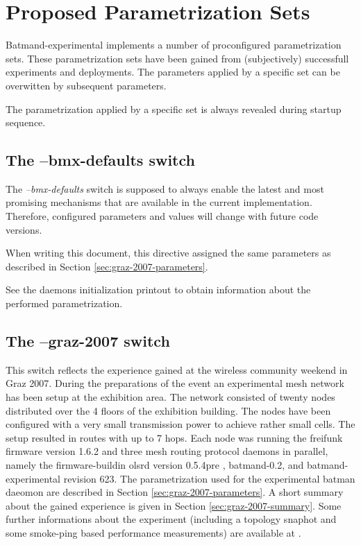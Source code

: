 \documentclass[11pt]{article}
\begin{document}

\section{Proposed Parametrization Sets}
\label{sec:proposed-parametrizations}

Batmand-experimental implements a number of proconfigured parametrization sets.
These parametrization sets have been gained from (subjectively) successfull experiments and deployments.
The parameters applied by a specific set can be overwitten by subsequent parameters.

The parametrization applied by a specific set is always revealed during startup sequence.

\subsection{The --bmx-defaults switch}
\label{sec:bmx-defaults}

The \emph{--bmx-defaults} switch is supposed to always enable the latest and most promising mechanisms that
are available in the current implementation. 
Therefore, configured parameters and values will change with future code versions.

When writing this document, this directive assigned the same parameters as described in Section \ref{sec:graz-2007-parameters}.

See the daemons initialization printout to obtain information about the performed parametrization.


\subsection{The --graz-2007 switch}
\label{sec:graz-2007}

This switch reflects the experience gained at the wireless community weekend in Graz 2007.
During the preparations of the event an experimental mesh network has been setup at the exhibition area.
The network consisted of twenty nodes distributed over the 4 floors of the exhibition building. 
The nodes have been configured with a very small transmission power to achieve rather small cells. 
The setup resulted in routes with up to 7 hops.
Each node was running the freifunk firmware \cite{freifunk-firmware} version 1.6.2 and three mesh routing protocol daemons in parallel, namely the firmware-buildin olsrd version 0.5.4pre \cite{olsr-org}, batmand-0.2, and batmand-experimental revision 623. 
The parametrization used for the experimental batman daeomon are described in Section \ref{sec:graz-2007-parameters}.
A short summary about the gained experience is given in Section \ref{sec:graz-2007-summary}.
%
Some further informations about the experiment (including a topology snaphot and some smoke-ping based performance measurements) are available at \cite{graz-experience}.
\end{document}
